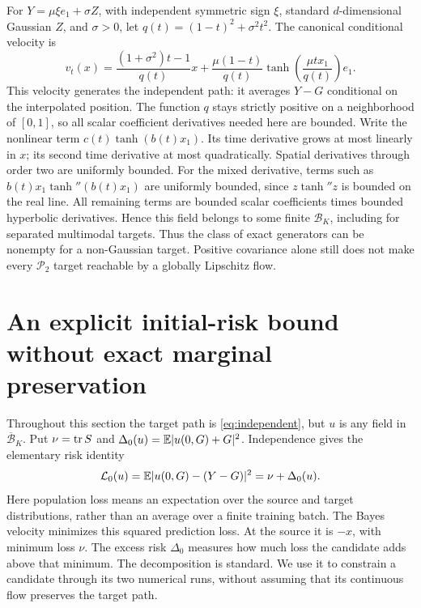 For $Y=\mu\xi e_1+\sigma Z$, with independent symmetric sign $\xi$,
standard $d$-dimensional Gaussian $Z$, and $\sigma>0$, let
$q(t)=(1-t)^2+\sigma^2t^2$. The canonical conditional velocity is
\begin{equation}
 v_t(x)=\frac{(1+\sigma^2)t-1}{q(t)}x+
 \frac{\mu(1-t)}{q(t)}
 \tanh\left(\frac{\mu t x_1}{q(t)}\right)e_1.
 \label{eq:mixture-generator}
\end{equation}
This velocity generates the independent path: it averages $Y-G$ conditional
on the interpolated position. The function $q$ stays
strictly positive on a neighborhood of $[0,1]$, so all scalar coefficient
derivatives needed here are bounded. Write the nonlinear term
$c(t)\tanh(b(t)x_1)$. Its time derivative grows at most linearly in $x$;
its second time derivative at most quadratically. Spatial derivatives
through order two are uniformly bounded. For the mixed derivative,
terms such as $b(t)x_1\tanh''(b(t)x_1)$ are uniformly bounded, since
$z\tanh''z$ is bounded on the real line. All remaining terms are bounded
scalar coefficients times bounded hyperbolic derivatives. Hence this
field belongs to some finite $\mathcal B_K$, including for separated
multimodal targets.
Thus the class of exact generators can be nonempty for a non-Gaussian
target. Positive covariance alone still does not make every
$\mathcal P_2$ target reachable by a globally Lipschitz flow.

\section{An explicit initial-risk bound without exact marginal preservation}
\label{app:risk}

Throughout this section the target path is \eqref{eq:independent}, but
$u$ is any field in $\overline{\mathcal B}_K$. Put $\nu=\operatorname{tr} S$ and
$\Delta_0(u)=\mathbb E|u(0,G)+G|^2$. Independence gives the elementary risk identity
\begin{equation}
 \mathcal L_0(u)=\mathbb E|u(0,G)-(Y-G)|^2=\nu+\Delta_0(u).
 \label{eq:source-loss-proof}
\end{equation}
Here population loss means an expectation over the source and target
distributions, rather than an average over a finite training batch.
The Bayes velocity minimizes this squared prediction loss. At the source
it is $-x$, with minimum loss $\nu$. The excess risk $\Delta_0$ measures
how much loss the candidate adds above that minimum. The decomposition is
standard. We use it to constrain a candidate through its two numerical runs,
without assuming that its continuous flow preserves the target path.\AIassistance

